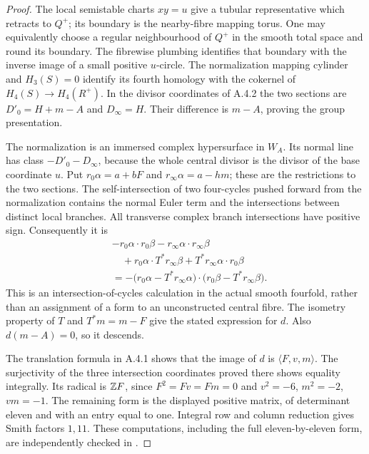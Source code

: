 \begin{proof}
The local semistable charts $xy=u$ give a tubular representative which
retracts to $Q^+$; its boundary is the nearby-fibre mapping torus. One
may equivalently choose a regular neighbourhood of $Q^+$ in the smooth
total space and round its boundary. The fibrewise plumbing identifies
that boundary with the inverse image of a small positive $u$-circle.
The normalization mapping cylinder and $H_3(S)=0$ identify its fourth
homology with the cokernel of
$H_4(S)\to H_4(R^+)$. In the divisor coordinates of A.4.2 the two
sections are $D'_0=H+m-A$ and $D_\infty=H$. Their difference is
$m-A$, proving the group presentation.

The normalization is an immersed complex hypersurface in $W_A$.
Its normal line has class $-D'_0-D_\infty$, because the whole central
divisor is the divisor of the base coordinate $u$. Put
$r_0\alpha=a+bF$ and $r_\infty\alpha=a-hm$; these are the
restrictions to the two sections. The self-intersection of two
four-cycles pushed forward from the normalization contains the normal
Euler term and the intersections between distinct local branches.
All transverse complex branch intersections have positive sign.
Consequently it is
\begin{align*}
 &-r_0\alpha\cdot r_0\beta-r_\infty\alpha\cdot r_\infty\beta\\
 &\quad+r_0\alpha\cdot T^*r_\infty\beta
       +T^*r_\infty\alpha\cdot r_0\beta\\
 &=-\bigl(r_0\alpha-T^*r_\infty\alpha\bigr)
       \cdot\bigl(r_0\beta-T^*r_\infty\beta\bigr).
\end{align*}
This is an intersection-of-cycles calculation in the actual smooth
fourfold, rather than an assignment of a form to an unconstructed
central fibre. The isometry property of $T$ and $T^*m=m-F$ give
the stated expression for $d$. Also $d(m-A)=0$, so it descends.

The translation formula in A.4.1 shows that the image of $d$ is
$\langle F,v,m\rangle$. The surjectivity of the three intersection
coordinates proved there shows equality integrally. Its radical is
$\mathbb Z F$, since $F^2=Fv=Fm=0$ and
$v^2=-6$, $m^2=-2$, $vm=-1$. The remaining form is the displayed
positive matrix, of determinant eleven and with an entry equal to
one. Integral row and column reduction gives Smith factors $1,11$.
These computations, including the full eleven-by-eleven form, are
independently checked in .
\end{proof}

